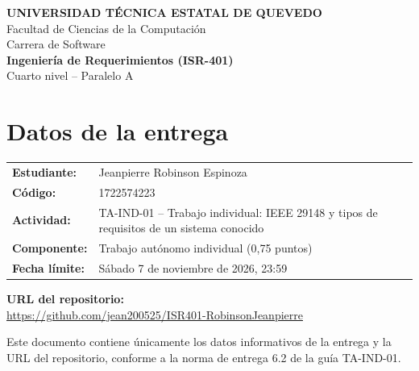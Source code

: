 \documentclass[12pt,a4paper]{article}
\begin{document}
\begin{center}
  {\large\bfseries UNIVERSIDAD TÉCNICA ESTATAL DE QUEVEDO}\\[4pt]
  Facultad de Ciencias de la Computación\\
  Carrera de Software\\[10pt]
  {\large\bfseries Ingeniería de Requerimientos (ISR-401)}\\[4pt]
  Cuarto nivel -- Paralelo A
\end{center}

\vspace{1.2cm}

\section*{Datos de la entrega}

\begin{tabular}{@{}p{4.5cm}p{10cm}@{}}
  \textbf{Estudiante:}   & Jeanpierre Robinson Espinoza \\[6pt]
  \textbf{Código:}       & 1722574223 \\[6pt]
  \textbf{Actividad:}    & TA-IND-01 -- Trabajo individual: IEEE 29148 y
                           tipos de requisitos de un sistema conocido \\[6pt]
  \textbf{Componente:}   & Trabajo autónomo individual (0,75 puntos) \\[6pt]
  \textbf{Fecha límite:} & Sábado 7 de noviembre de 2026, 23:59 \\
\end{tabular}

\vspace{0.8cm}

\noindent\textbf{URL del repositorio:}\\[4pt]
\noindent\url{https://github.com/jean200525/ISR401-RobinsonJeanpierre}

\vspace{1.2cm}

\noindent\small
Este documento contiene únicamente los datos informativos de la entrega y la
URL del repositorio, conforme a la norma de entrega 6.2 de la guía TA-IND-01.
\end{document}
